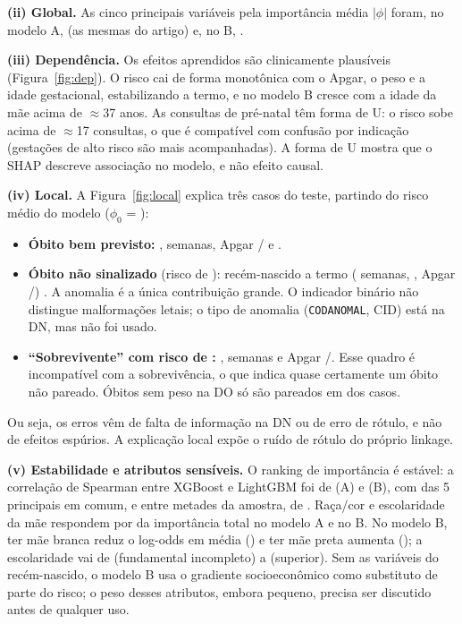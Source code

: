 \documentclass[12pt]{article}
\begin{document}
\textbf{(ii) Global.} As cinco principais variáveis pela importância média $|\phi|$ foram, no modelo A, \shapTopA{} (as mesmas do artigo) e, no B, \shapTopB{}.

\textbf{(iii) Dependência.} Os efeitos aprendidos são clinicamente plausíveis (Figura~\ref{fig:dep}). O risco cai de forma monotônica com o Apgar, o peso e a idade gestacional, estabilizando a termo, e no modelo B cresce com a idade da mãe acima de $\approx$37 anos. As consultas de pré-natal têm forma de U: o risco sobe acima de $\approx$17 consultas, o que é compatível com confusão por indicação (gestações de alto risco são mais acompanhadas). A forma de U mostra que o SHAP descreve associação no modelo, e não efeito causal.

\textbf{(iv) Local.} A Figura~\ref{fig:local} explica três casos do teste, partindo do risco médio do modelo ($\phi_0$ = \xaiBase{}): \begin{itemize}
  \item \textbf{Óbito bem previsto:} \xaiVpPeso{}, \xaiVpSem{} semanas, Apgar \xaiVpApgarUm{}/\xaiVpApgarCinco{} e \xaiVpAnom{}.
  \item \textbf{Óbito não sinalizado} (risco de \xaiFnProb{}): recém-nascido a termo (\xaiFnSem{} semanas, \xaiFnPeso{}, Apgar \xaiFnApgarUm{}/\xaiFnApgarCinco{}) \xaiFnAnom{}. A anomalia é a única contribuição grande. O indicador binário não distingue malformações letais; o tipo de anomalia (\texttt{CODANOMAL}, CID) está na DN, mas não foi usado.
  \item \textbf{``Sobrevivente'' com risco de \xaiFpProb{}:} \xaiFpPeso{}, \xaiFpSem{} semanas e Apgar \xaiFpApgarUm{}/\xaiFpApgarCinco{}. Esse quadro é incompatível com a sobrevivência, o que indica quase certamente um óbito não pareado. Óbitos sem peso na DO só são pareados em \linkPesoAus{} dos casos.
\end{itemize}
Ou seja, os erros vêm de falta de informação na DN ou de erro de rótulo, e não de efeitos espúrios. A explicação local expõe o ruído de rótulo do próprio linkage.

\textbf{(v) Estabilidade e atributos sensíveis.} O ranking de importância é estável: a correlação de Spearman entre XGBoost e LightGBM foi de \xaiSpearA{} (A) e \xaiSpearB{} (B), com \xaiTopA{} das 5 principais em comum, e entre metades da amostra, de \xaiMetadesA{}. Raça/cor e escolaridade da mãe respondem por \xaiSensA{} da importância total no modelo A e \xaiSensB{} no B. No modelo B, ter mãe branca reduz o log-odds em média (\xaiBrancaB{}) e ter mãe preta aumenta (\xaiPretaB{}); a escolaridade vai de \xaiEscBaixaB{} (fundamental incompleto) a \xaiEscSupB{} (superior).
Sem as variáveis do recém-nascido, o modelo B usa o gradiente socioeconômico como substituto de parte do risco; o peso desses atributos, embora pequeno, precisa ser discutido antes de qualquer uso.
\end{document}
